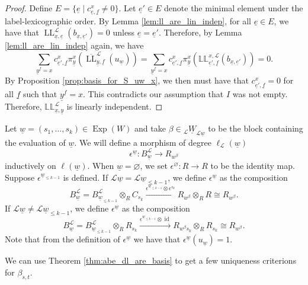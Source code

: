 \documentclass{amsart}
\newcommand{\scrL}{\mathcal{L}}
\DeclareMathOperator{\id}{id}
\DeclareMathOperator{\LL}{LL}
\newcommand{\dLL}{\mathbb{L}\mathbb{L}}
\DeclareMathOperator{\Exp}{Exp}
\newcommand{\uW}[2]{{}_{#1}\underline{W}_{#2}}
\newcommand{\ue}{\underline{e}}
\newcommand{\uf}{\underline{f}}
\newcommand{\uw}{\underline{w}}
\newcommand{\ux}{\underline{x}}
\newcommand{\uy}{\underline{y}}
\renewcommand{\emptyset}{\varnothing}
\theoremstyle{definition}
\numberwithin{equation}{subsection}
\begin{document}
\begin{proof}
    Define $E = \{ \ue \mid c_{\ue, \uf}^x \neq 0 \}$. Let $\ue' \in E$ denote the minimal element under the label-lexicographic order.
    By Lemma \ref{lem:ll_are_lin_indep}, for all $\ue \in E$, we have that $\LL_{\ux, \ue}^{\scrL} (b_{\ux, \ue'}) = 0$ unless $\ue = \ue'$.
    Therefore, by Lemma \ref{lem:ll_are_lin_indep} again, we have 
    \[ \sum_{\uy^{\uf} = x} c_{\ue', \uf}^x \pi_{\uy}^x (\overline{\LL}_{\uy, \uf}^{\scrL} (u_{\uw}) ) = \sum_{\uy^{\uf} = x} c_{\ue', \uf}^x \pi_{\uy}^x (\dLL_{\ue', \uf}^{x, \scrL} (b_{\ux, \ue'}) )  =0.\]
    By Proposition \ref{prop:basis_for_S_uw_x}, we then must have that $c_{\ue', \uf}^x = 0$ for all $\uf$ such that $\uy^{\uf} = x$. 
    This contradicts our assumption that $I$ was not empty. Therefore, $\dLL_{\ux, \uy}^{\scrL}$ is linearly independent.
\end{proof}

Let $\uw = (s_1, \ldots, s_k) \in \Exp (W)$ and take $\beta \in \uW{\scrL}{\scrL \uw}$ to be the block containing the evaluation of $\uw$.  
We will define a morphism of degree $\ell_{\scrL} (\uw)$
\[\epsilon^{\uw} : B_{\uw}^{\scrL} \to R_{w^{\beta}} \]
inductively on $\ell (\uw)$. When $\uw = \emptyset$, we set $\epsilon^{\emptyset} : R \to R$ to be the identity map.
Suppose $\epsilon^{\uw_{\leq k-1}}$ is defined. If $\scrL \uw = \scrL \uw_{\leq k-1}$, we define $\epsilon^{\uw}$ as the composition
\[B_{\uw}^{\scrL} = B_{\uw_{\leq k-1}}^{\scrL} \otimes_R C_{s_k} \stackrel{\epsilon^{\uw_{\leq k-1}} \otimes \epsilon^{s_k}}{\longrightarrow} R_{w^{\beta}} \otimes_R R \cong R_{w^{\beta}}. \]
If $\scrL \uw \neq \scrL \uw_{\leq k-1}$, we define $\epsilon^{\uw}$ as the composition
\[B_{\uw}^{\scrL} = B_{\uw_{\leq k-1}}^{\scrL} \otimes_R R_{s_k} \stackrel{\epsilon^{\uw_{\leq k-1}} \otimes \id}{\longrightarrow} R_{w^{\beta} s_k} \otimes_R R_{s_k} \cong R_{w^{\beta}}. \]
Note that from the definition of $\epsilon^{\uw}$ we have that $\epsilon^{\uw} (u_{\uw}) = 1$. 

We can use Theorem \ref{thm:abe_dl_are_basis} to get a few uniqueness criterions for $\beta_{s,t}$.
\end{document}

